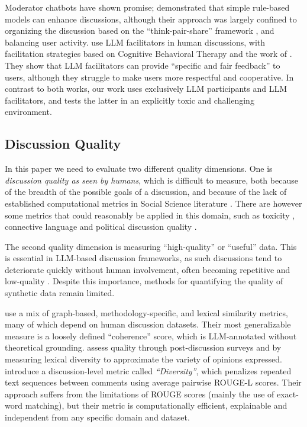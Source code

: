 Moderator chatbots have shown promise; \citet{kim_et_al_chatbot} demonstrated that simple rule-based models can enhance discussions, although their approach was largely confined to organizing the discussion based on the ``think-pair-share'' framework \cite{ahmad_2010_supporting, Navajas2018}, and balancing user activity. \citet{cho-etal-2024-language} use LLM facilitators in human discussions, with facilitation strategies based on Cognitive Behavioral Therapy and the work of \citet{rosenberg2015nonviolent}. They show that LLM facilitators can provide “specific and fair feedback” to users, although they struggle to make users more respectful and cooperative.  In contrast to both works, our work uses exclusively LLM participants and LLM facilitators, and tests the latter in an explicitly toxic and challenging environment.


\subsection{Discussion Quality}
\label{ssec:related:quality}

In this paper we need to evaluate two different quality dimensions. One is \emph{discussion quality as seen by humans}, which is difficult to measure, both because of the breadth of the possible goals of a discussion, and because of the lack of established computational metrics in Social Science literature \cite{korre2025evaluation}. There are however some metrics that could reasonably be applied in this domain, such as toxicity \citep{dekock2022disagree, XiaToxicity}, connective language \citep{lukito-etal-2024-comparing} and political discussion quality \citep{Jaidka_2022}.

The second quality dimension is measuring “high-quality” or “useful” data. This is essential in LLM-based discussion frameworks, as such discussions tend to deteriorate quickly without human involvement, often becoming repetitive and low-quality \citep{ulmer2024}. Despite this importance, methods for quantifying the quality of synthetic data remain limited.

\citet{balog_2024} use a mix of graph-based, methodology-specific, and lexical similarity metrics, many of which depend on human discussion datasets. Their most generalizable measure is a loosely defined “coherence” score, which is LLM-annotated without theoretical grounding. \citet{kim_et_al_chatbot} assess quality through post-discussion surveys and by measuring lexical diversity to approximate the variety of opinions expressed. \citet{ulmer2024}  introduce a discussion-level metric called \emph{``Diversity''}, which penalizes repeated text sequences between comments using average pairwise ROUGE-L \citep{lin-2004-rouge} scores. Their approach suffers from the limitations of ROUGE scores (mainly the use of exact-word matching), but their metric is computationally efficient, explainable and independent from any specific domain and dataset.

